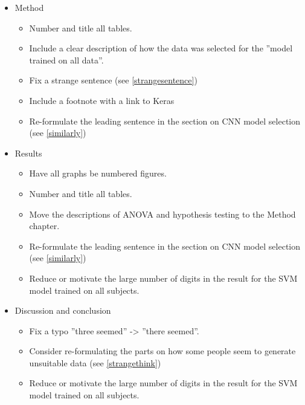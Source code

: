 \documentclass[a4paper,12pt]{article}
\begin{document}
\begin{itemize}
    \item Method
    \begin{itemize}
        \item Number and title all tables.
        \item Include a clear description of how the data was selected for the ''model trained on all data''.
        \item Fix a strange sentence (see \ref{strangesentence})
        \item Include a footnote with a link to Keras
        \item Re-formulate the leading sentence in the section on CNN model selection (see \ref{similarly})
    \end{itemize}
    \item Results
    \begin{itemize}
        \item Have all graphs be numbered figures.
        \item Number and title all tables.
        \item Move the descriptions of ANOVA and hypothesis testing to the Method chapter.
        \item Re-formulate the leading sentence in the section on CNN model selection (see \ref{similarly})
        \item Reduce or motivate the large number of digits in the result for the SVM model trained on all subjects.
    \end{itemize}
    \item Discussion and conclusion
    \begin{itemize}
        \item Fix a typo ''three seemed'' -> ''there seemed''.
        \item Consider re-formulating the parts on how some people seem to generate unsuitable data (see \ref{strangethink})
        \item Reduce or motivate the large number of digits in the result for the SVM model trained on all subjects.
    \end{itemize}
\end{itemize}
\end{document}
